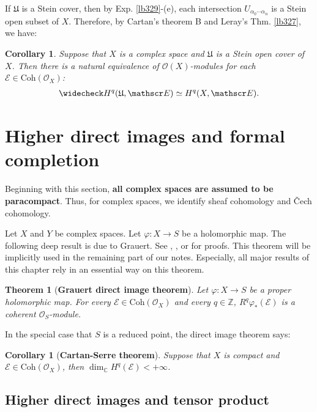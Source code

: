 \documentclass[12pt,b5paper,notitlepage]{report}
\theoremstyle{definition}
\theoremstyle{plain}
\newtheorem{thm}[df]{Theorem}
\newtheorem{co}[df]{Corollary}
\newcommand{\fk}{\mathfrak}
\newcommand{\wch}{\widecheck}
\newcommand{\scr}{\mathscr}
\newcommand{\Cbb}{\mathbb C}
\newcommand{\Zbb}{\mathbb Z}
\newcommand{\Coh}{\mathrm{Coh}}
\numberwithin{equation}{section}
\begin{document}
If $\fk U$ is a Stein cover, then by Exp. \ref{lb329}-(e), each intersection $U_{\alpha_0\cdots\alpha_n}$ is a Stein open subset of $X$. Therefore, by Cartan's theorem B and Leray's Thm. \ref{lb327}, we have:

\begin{co}
Suppose that $X$ is a complex space and $\fk U$ is a Stein open cover of $X$. Then there is a natural equivalence of $\scr O(X)$-modules for each $\scr E\in\Coh(\scr O_X)$:
\begin{align*}
\wch H^q(\fk U,\scr E)\simeq H^q(X,\scr E).
\end{align*}
\end{co}





\section{Higher direct images and formal completion}


Beginning with this section, \textbf{all complex spaces are assumed to be paracompact}. Thus, for complex spaces, we identify sheaf cohomology and \v Cech cohomology. 

Let $X$ and $Y$ be complex spaces. Let $\varphi:X\rightarrow S$ be a holomorphic map. The following deep result is due to Grauert. See \cite[Chapter 10]{GR-b}, \cite[Sec. 3.2]{BS}, or \cite[Sec. IX.5]{Dem} for proofs. This theorem will be implicitly used in the remaining part of our notes. Especially, all major results of this chapter rely in an essential way on this theorem.


\begin{thm}[\textbf{Grauert direct image theorem}]\label{lb334} 
Let $\varphi:X\rightarrow S$ be a proper holomorphic map. For every $\scr E\in\Coh(\scr O_X)$ and every $q\in\Zbb$, $R^q\varphi_*(\scr E)$ is a coherent $\scr O_S$-module.
\end{thm}

In the special case that $S$ is a reduced point, the direct image theorem says:

\begin{co}[\textbf{Cartan-Serre theorem}]
Suppose that $X$ is compact and $\scr E\in\Coh(\scr O_X)$, then $\dim_\Cbb H^q(\scr E)<+\infty$.
\end{co}

\subsection{Higher direct images and tensor product}\label{lb335}
\end{document}
